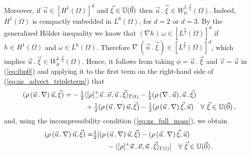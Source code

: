 Moreover, if $\vec u\in [H^1(\Omega)]^d$ and $\vec \xi \in \mathbb{U}(\vec{0})$ then
$\vec u\,.\,\vec\xi \in W_0^{1,\frac{3}{2}}(\Omega)$. Indeed, $H^1(\Omega)$ is
compactly embedded in $L^6(\Omega)$, for $d=2$ or $d=3$. By the
generalized H\"{o}lder inequality we know that $(\nabla h)\,\omega\in
[L^{\frac{3}{2}}(\Omega)]^d$ if $h\in H^1(\Omega)$ and $\omega\in L^6(\Omega)$.
Therefore $\nabla\,(\vec u\,.\,\vec \xi)\in [L^{\frac{3}{2}}(\Omega)]^d$,
which implies
$\vec u\,.\,\vec \xi \in W_0^{1,\frac{3}{2}}(\Omega)$. Hence, it follows from
taking $\phi = \vec u\,.\,\vec\xi$ and $\vec v = \vec u$ in (\ref{eq:ibp0}) and
applying it to the first term on the right-hand side of
(\ref{eq:ns_advect_tripleterm}) that
\begin{align}\label{eq:fulladvect}
( \rho\,(\vec u \,.\,\nabla)\,\vec u, \vec \xi) = &
-\tfrac{1}{2}\langle [\rho]_-^+\vec u\,.\,\vec \nu, \vec u\,.\,\vec \xi
\rangle_{\Gamma(t)}
-\tfrac{1}{2}(\rho\,(\nabla\,.\,\vec u ),\vec u\,.\,\vec\xi) \nonumber \\
& \qquad +\tfrac{1}{2}(\rho\,(\vec u\,.\,\nabla)\,\vec u, \vec \xi)
-\tfrac{1}{2}(\rho\,(\vec u\,.\,\nabla)\,\vec \xi,\vec u)
\quad \forall\ \vec \xi \in \mathbb{U}(\vec{0})\,,
\end{align}
and, using the incompressibility condition (\ref{eq:ns_full_mass}), we obtain
\begin{align}\label{eq:advect}
( \rho\,(\vec u \,.\,\nabla)\,\vec u, \vec \xi)
= & \tfrac{1}{2} [ (\rho\,(\vec u\,.\,\nabla)\,\vec u, \vec \xi) -
(\rho\,(\vec u\,.\,\nabla)\,\vec \xi,\vec u) \nonumber \\
& \qquad -\langle [\rho]_-^+\vec u\,.\,\vec \nu, \vec u\,.\,\vec \xi
\rangle_{\Gamma(t)}] \quad \forall\ \vec \xi \in \mathbb{U}(\vec{0})\,.
\end{align}

